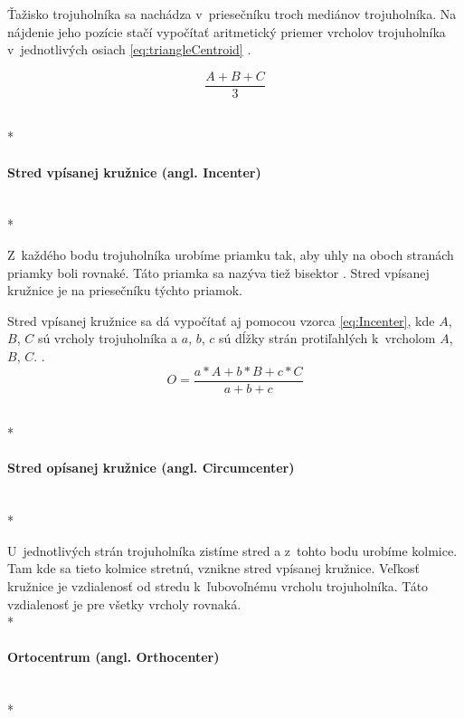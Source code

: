 Ťažisko trojuholníka sa nachádza v~priesečníku troch mediánov trojuholníka. Na nájdenie jeho pozície stačí vypočítať aritmetický priemer vrcholov trojuholníka v~jednotlivých osiach \ref{eq:triangleCentroid} \cite{Centroid_of_a_Triangle}.



\begin{equation}
    \frac{A+B+C}{3}
    \label{eq:triangleCentroid}
\end{equation}

 \mbox{} \\*
\paragraph{Stred vpísanej kružnice (angl. Incenter)}\unskip \mbox{} \\*
\label{sec:TriangleCenter}

Z~každého bodu trojuholníka urobíme priamku tak, aby uhly na oboch stranách priam\-ky boli rovnaké. Táto priamka sa nazýva tiež bisektor \cite{angle_bisector_theorem}. Stred vpísanej kružnice je na priesečníku týchto priamok.




Stred vpísanej kružnice sa dá vypočítať aj pomocou vzorca \ref{eq:Incenter}, kde  $A$, $B$, $C$ sú vrcholy trojuholníka a $a$, $b$, $c$ sú dĺžky strán protiľahlých k~vrcholom $A$, $B$, $C$. \cite{Incenter_page_2011}.
\begin{equation}
O = \frac{a\ast A+b\ast  B +c \ast C}{a + b + c}
    \label{eq:Incenter}
\end{equation}


 \mbox{} \\*
\paragraph{Stred opísanej kružnice (angl. Circumcenter)}\unskip \mbox{} \\*

U~jednotlivých strán trojuholníka zistíme stred a z~tohto bodu urobíme kolmice. Tam kde sa tieto kolmice stretnú, vznikne stred vpísanej kružnice. Veľkosť kružnice je vzdialenosť od stredu k~ľubovoľnému vrcholu trojuholníka. Táto vzdialenosť je pre všetky vrcholy rovnaká.
 \mbox{} \\*

\paragraph{Ortocentrum (angl. Orthocenter)}\unskip \mbox{} \\*

